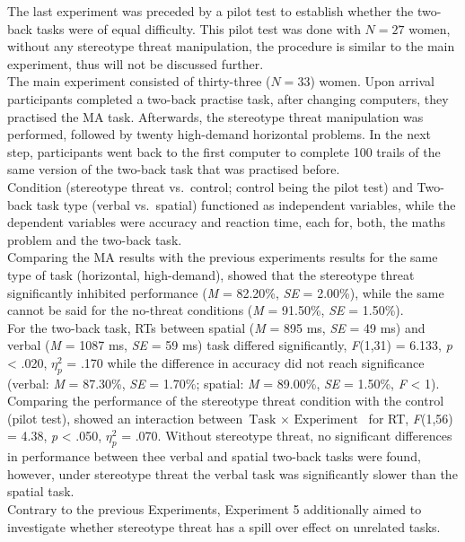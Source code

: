 \documentclass[
  stu,floatsintext]{apa7}
\begin{document}
The last experiment was preceded by a pilot test to establish whether the two-back tasks were of equal difficulty.
This pilot test was done with \(N = 27\) women, without any stereotype threat manipulation, the procedure is similar to the main experiment, thus will not be discussed further.\\
The main experiment consisted of thirty-three (\(N = 33\)) women.
Upon arrival participants completed a two-back practise task, after changing computers, they practised the MA task.
Afterwards, the stereotype threat manipulation was performed, followed by twenty high-demand horizontal problems.
In the next step, participants went back to the first computer to complete 100 trails of the same version of the two-back task that was practised before.\\
Condition (stereotype threat vs.~control; control being the pilot test) and Two-back task type (verbal vs.~spatial) functioned as independent variables, while the dependent variables were accuracy and reaction time, each for, both, the maths problem and the two-back task.\\
Comparing the MA results with the previous experiments results for the same type of task (horizontal, high-demand), showed that the stereotype threat significantly inhibited performance (\emph{M} = 82.20\%, \emph{SE} = 2.00\%), while the same cannot be said for the no-threat conditions (\emph{M} = 91.50\%, \emph{SE} = 1.50\%).\\
For the two-back task, RTs between spatial (\emph{M} = 895 ms, \emph{SE} = 49 ms) and verbal (\emph{M} = 1087 ms, \emph{SE} = 59 ms) task differed significantly, \emph{F}(1,31) = 6.133, \emph{p} \textless{} .020, \(\eta^{2}_{p}\) = .170 while the difference in accuracy did not reach significance (verbal: \emph{M} = 87.30\%, \emph{SE} = 1.70\%; spatial: \emph{M} = 89.00\%, \emph{SE} = 1.50\%, \emph{F} \textless{} 1).
Comparing the performance of the stereotype threat condition with the control (pilot test), showed an interaction between \(\text{Task } \times \text{ Experiment }\) for RT, \emph{F}(1,56) = 4.38, \emph{p} \textless{} .050, \(\eta^{2}_{p}\) = .070.
Without stereotype threat, no significant differences in performance between thee verbal and spatial two-back tasks were found, however, under stereotype threat the verbal task was significantly slower than the spatial task.\\
Contrary to the previous Experiments, Experiment 5 additionally aimed to investigate whether stereotype threat has a spill over effect on unrelated tasks.
\end{document}

